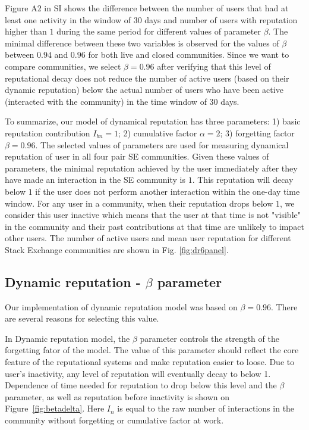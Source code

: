 Figure A2 in SI shows the difference between the number of users that had at least one activity in the window of 30 days and number of users with reputation higher than $1$ during the same period for different values of parameter $\beta$. The minimal difference between these two variables is observed for the values of $\beta$ between $0.94$ and $0.96$ for both live and closed communities. Since we want to compare communities, we select $\beta = 0.96$ after verifying that this level of reputational decay does not reduce the number of active users (based on their dynamic reputation) below the actual number of users who have been active (interacted with the community) in the time window of 30 days. 

To summarize, our model of dynamical reputation has three parameters: 1) basic reputation contribution $I_{bn}=1$; 2) cumulative factor $\alpha=2$; 3) forgetting factor $\beta=0.96$. The selected values of parameters are used for measuring dynamical reputation of user in all four pair SE communities. Given these values of parameters, the minimal reputation achieved by the user immediately after they have made an interaction in the SE community is $1$. This reputation will decay below $1$ if the user does not perform another interaction within the one-day time window. For any user in a community, when their reputation drops below $1$, we consider this user inactive which means that the user at that time is not "visible" in the community and their past contributions at that time are unlikely to impact other users. The number of active users and mean user reputation for different Stack Exchange communities are shown in Fig. \ref{fig:dr6panel}.


\subsection{Dynamic reputation - $\beta$ parameter}

Our implementation of dynamic reputation model was based on $\beta = 0.96$. There are several reasons for selecting this value.

In Dynamic reputation model, the $\beta$ parameter controls the strength of the forgetting fator of the model.  The value of this parameter should reflect the core feature of the reputational systems and make reputation easier to loose. Due to user's inactivity, any level of reputation will eventually decay to below 1. Dependence of time needed for reputation to drop below this level and the $\beta$ parameter, as well as reputation before inactivity is shown on Figure~\ref{fig:betadelta}. Here $I_n$ is equal to the raw number of interactions in the community without forgetting or cumulative factor at work.

